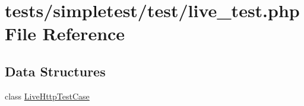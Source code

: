 \hypertarget{live__test_8php}{\section{tests/simpletest/test/live\-\_\-test.php File Reference}
\label{live__test_8php}
}
\subsection*{Data Structures}
\begin{DoxyCompactItemize}
\item 
class \hyperlink{class_live_http_test_case}{Live\-Http\-Test\-Case}
\end{DoxyCompactItemize}
